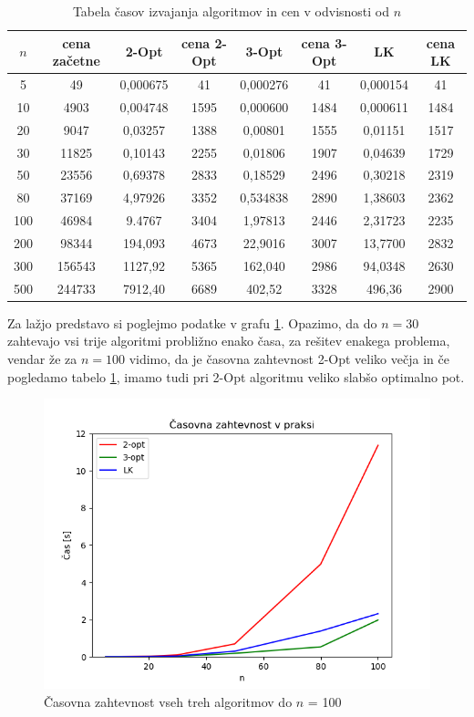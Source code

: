 \documentclass[12pt, a4paper]{article}
\begin{document}
\begin{table}[!h]
\begin{tabular}{|c|c|c|c|c|c|c|c|}
\hline
$n$&cena začetne&2-Opt&cena 2-Opt&3-Opt&cena 3-Opt&LK&cena LK\\\hline
5&49&0,000675&41&0,000276&41&0,000154&41\\\hline
10&4903&0,004748&1595&0,000600&1484&0,000611&1484\\\hline
20&9047&0,03257&1388&0,00801&1555&0,01151&1517\\\hline
30&11825&0,10143&2255&0,01806&1907&0,04639&1729\\\hline
50&23556&0,69378&2833&0,18529&2496&0,30218&2319\\\hline
80&37169&4,97926&3352&0,534838&2890&1,38603&2362\\\hline
100&46984&9.4767&3404&1,97813&2446&2,31723&2235\\\hline
200&98344&194,093&4673&22,9016&3007&13,7700&2832\\\hline
300&156543&1127,92&5365&162,040&2986&94,0348&2630\\\hline
500&244733&7912,40&6689&402,52&3328&496,36&2900\\\hline
\end{tabular}
\caption{Tabela časov izvajanja algoritmov in cen v odvisnosti od $n$}
\label{tabela_casov}
\end{table}

Za lažjo predstavo si poglejmo podatke v grafu \ref{casovna_do_100}. Opazimo, da do $n=30$ zahtevajo vsi trije algoritmi probližno enako časa, za rešitev enakega problema, vendar že za $n=100$ vidimo, da je časovna zahtevnost 2-Opt veliko večja in če pogledamo tabelo \ref{tabela_casov}, imamo tudi pri 2-Opt algoritmu veliko slabšo optimalno pot.

\begin{figure}[!h]
 \begin{center}
  \includegraphics[width=12 cm]{casovna_zahtevnost_do_100.png}
  \caption{Časovna zahtevnost vseh treh algoritmov do $n$ = 100}
  \label{casovna_do_100}
\end{center}
\end{figure}
\end{document}
